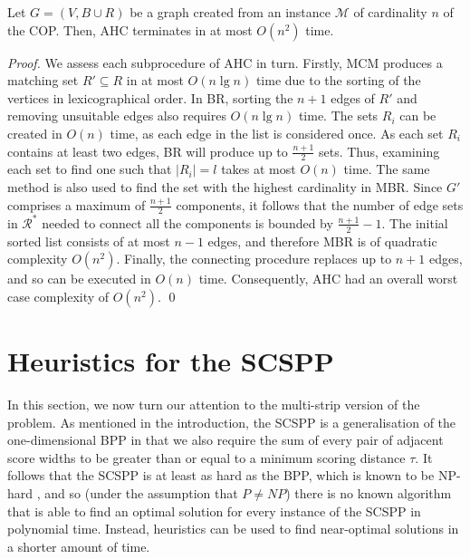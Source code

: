 \documentclass[runningheads]{llncs}
\begin{document}
\begin{theorem}
	\label{thm:copsoln}
	Let $G=(V, B \cup R)$ be a graph created from an instance $\mathcal{M}$ of cardinality $n$ of the COP. Then, AHC terminates in at most $O(n^2)$ time.
\end{theorem}

\begin{proof}
	We assess each subprocedure of AHC in turn. Firstly, MCM produces a matching set $R' \subseteq R$ in at most $O(n \lg n)$ time due to the sorting of the vertices in lexicographical order. In BR, sorting the $n+1$ edges of $R'$ and removing unsuitable edges also requires $O(n \lg n)$ time. The sets $R_i$ can be created in $O(n)$ time, as each edge in the list is considered once. As each set $R_i$ contains at least two edges, BR will produce up to $\frac{n+1}{2}$ sets. Thus, examining each set to find one such that $|R_i| = l$ takes at most $O(n)$ time. The same method is also used to find the set with the highest cardinality in MBR. Since $G'$ comprises a maximum of $\frac{n+1}{2}$ components, it follows that the number of edge sets in $\mathcal{R}^{*}$ needed to connect all the components is bounded by $\frac{n+1}{2}-1$. The initial sorted list consists of at most $n-1$ edges, and therefore MBR is of quadratic complexity $O(n^2)$. Finally, the connecting procedure replaces up to $n+1$ edges, and so can be executed in $O(n)$ time. Consequently, AHC had an overall worst case complexity of $O(n^2)$. \qed
\end{proof}	


\section{Heuristics for the SCSPP}
\label{sec:scsppsoln}

In this section, we now turn our attention to the multi-strip version of the problem. As mentioned in the introduction, the SCSPP is a generalisation of the one-dimensional BPP in that we also require the sum of every pair of adjacent score widths to be greater than or equal to a minimum scoring distance $\tau$. It follows that the SCSPP is at least as hard as the BPP, which is known to be NP-hard \cite{garey1979}, and so (under the assumption that $P \neq NP$) there is no known algorithm that is able to find an optimal solution for every instance of the SCSPP in polynomial time. Instead, heuristics can be used to find near-optimal solutions in a shorter amount of time.
\end{document}
